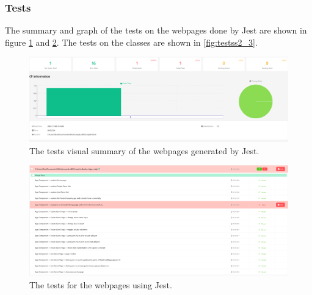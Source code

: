 \documentclass{article}
\begin{document}
\subsubsection{Tests}
The summary and graph of the tests on the webpages done by Jest are shown in figure \ref{fig:testss2_1} and \ref{fig:testss2_2}. The tests on the classes are shown in \ref{fig:testss2_3}.

\begin{figure}[h]
\centering
\includegraphics[width=\linewidth]{testss2_1.png}
\caption{\label{fig:testss2_1}The tests visual summary of the webpages generated by Jest.}
\end{figure}

\begin{figure}[h]
\centering
\includegraphics[width=\linewidth]{tests2_2.png}
\caption{\label{fig:testss2_2}The tests for the webpages using Jest.}
\end{figure}
\end{document}
